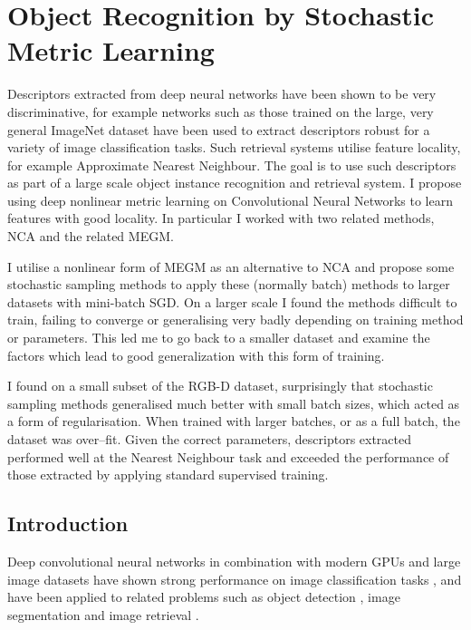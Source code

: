 
\chapter{Object Recognition by Stochastic Metric Learning}
\label{chap:metric} 

Descriptors extracted from deep neural networks have been shown to be very discriminative,
for example networks such as those trained on the large, very general ImageNet dataset have been used to extract descriptors robust for a variety of image classification tasks. Such retrieval systems utilise feature locality, for example Approximate Nearest Neighbour. The goal is to use such descriptors as part of a large scale object instance recognition and retrieval system. I propose using deep nonlinear metric learning on Convolutional Neural Networks to learn features with good locality. In particular I worked with two related methods, \gls{NCA} and the related \gls{MEGM}.

I utilise a nonlinear form of \gls{MEGM} as an alternative to \gls{NCA} and propose some stochastic sampling methods to apply these (normally batch) methods to larger datasets with mini-batch \gls{SGD}. On a larger scale I found the methods difficult to train, failing to converge or generalising very badly depending on training method or parameters. This led me to go back to a smaller dataset and examine the factors which lead to good generalization with this form of training.
  
I found on a small subset of the RGB-D dataset, surprisingly that  stochastic sampling methods
 generalised much better with small batch sizes, which acted as a form of regularisation. When trained with larger batches, or as a full batch, the dataset was over--fit. Given the correct parameters, descriptors extracted performed well at the Nearest Neighbour task and exceeded the performance of those extracted by applying standard supervised training.





\section{Introduction}

Deep convolutional neural networks in combination with modern \gls{GPU}s and large image datasets have shown strong performance on image classification tasks \cite {Krizhevsky2012}, and have been applied to related problems such as object detection \cite{Sermanet2013}, image segmentation \cite{Masci2013} and image retrieval \cite{Razavian2014}.

